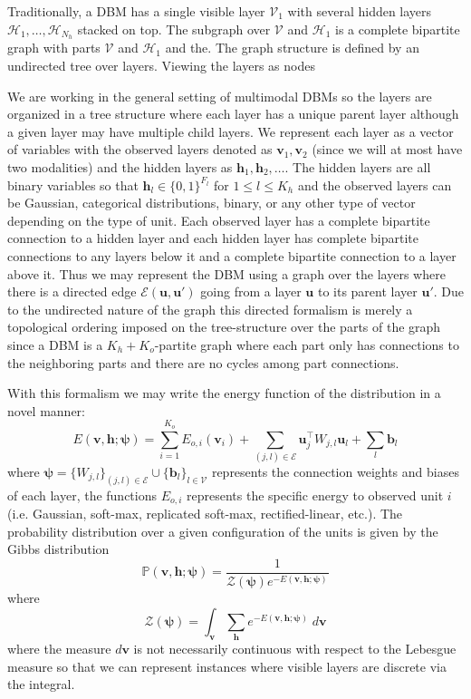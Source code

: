 \documentclass{article} %
\begin{document}
 Traditionally, a DBM has a single visible layer $\mathcal{V}_1$
with several hidden layers $\mathcal{H}_1,\ldots,\mathcal{H}_{N_h}$ stacked on top. The subgraph over $\mathcal{V}$ and $\mathcal{H}_1$ 
is a complete bipartite
graph with parts $\mathcal{V}$ and $\mathcal{H}_1$ and the.   The graph structure is defined by an undirected tree over layers. Viewing
the layers as nodes 

We are working in the general setting of multimodal DBMs so the layers are organized in a tree structure where each layer
has a unique parent layer although a given layer may have multiple child layers.  We represent each layer as a vector of variables
with the observed layers denoted as $\mathbf{v}_1,\mathbf{v}_2$ (since we will
at most have two modalities) and the hidden layers as $\mathbf{h}_1,\mathbf{h}_2,\ldots$.  The hidden layers are all binary variables
so that $\mathbf{h}_l\in \{0,1\}^{F_l}$ for $1\leq l\leq K_h$ and the observed layers can be Gaussian, categorical distributions, binary,
or any other type of vector depending on the type of unit. Each observed layer has a complete bipartite connection to a hidden layer
and each hidden layer has complete bipartite connections to any layers below it and a complete bipartite connection to a layer above it.
Thus we may represent the DBM using a graph over the layers where there is a directed edge $\mathcal{E}(\mathbf{u},\mathbf{u}')$
going from a layer $\mathbf{u}$ to its parent layer $\mathbf{u}'$.  Due to the undirected nature of the graph this directed formalism
is merely a topological ordering imposed on the tree-structure over the parts of the graph since a DBM is a $K_h+K_o$-partite graph
where each part only has connections to the neighboring parts and there are no cycles among part connections.

With this formalism we may write the energy function of the distribution in a novel manner:
\begin{equation}
E(\mathbf{v},\mathbf{h};\boldsymbol{\psi}) = \sum_{i=1}^{K_o} E_{o,i}(\mathbf{v}_i) + \sum_{(j,l)\in\mathcal{E}} \mathbf{u}^\top_j W_{j,l}\mathbf{u}_l + \sum_l \mathbf{b}_l
\end{equation}
where $\boldsymbol{\psi}=\{ W_{j,l} \}_{(j,l)\in\mathcal{E}} \cup \{ \mathbf{b}_l \}_{l\in\mathcal{V}}$ represents the connection weights and biases
of each layer, the functions $E_{o,i}$ represents the specific energy to observed unit $i$ (i.e. Gaussian, soft-max, replicated soft-max, rectified-linear, etc.).  The probability distribution over a given configuration of the units is given by the Gibbs distribution
\begin{equation}
\mathbb{P}(\mathbf{v},\mathbf{h};\boldsymbol{\psi}) = \frac{1}{\mathcal{Z}(\boldsymbol{\psi})e^{-E(\mathbf{v},\mathbf{h};\boldsymbol{\psi})}}
\end{equation}
where
\begin{equation}
\mathcal{Z}(\boldsymbol{\psi}) = \int_{\mathbf{v}}\sum_{\mathbf{h}} e^{-E(\mathbf{v},\mathbf{h};\boldsymbol{\psi})}\;d\mathbf{v}
\end{equation}
where the measure $d\mathbf{v}$ is not necessarily continuous with respect to the Lebesgue measure so that we can represent
instances where visible layers are discrete via the integral.
\end{document}
